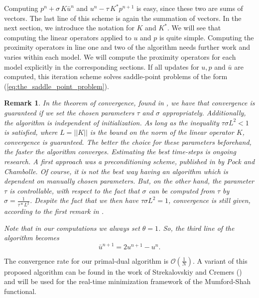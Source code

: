 \documentclass[abstracton]{scrreprt}
\newtheorem{remark}[theorem]{Remark}
\begin{document}
        Computing $p^{n} + \sigma\,K\bar{u}^{n}$ and $u^{n} - \tau\,K^{\ast}p^{n+1}$ is easy, since these two are sums of vectors. The last line of this scheme is again the summation of vectors. In the next section, we introduce the notation for $K$ and $K^{\ast}$. We will see that computing the linear operators applied to $u$ and $p$ is quite simple. Computing the proximity operators in line one and two of the algorithm needs further work and varies within each model. We will compute the proximity operators for each model explicitly in the corresponding sections. If all updates for $u, p$ and $\bar{u}$ are computed, this iteration scheme solves saddle-point problems of the form (\ref{eq:the_saddle_point_problem}).
        \begin{remark}
            In the theorem of convergence, found in \cite{Chambolle10afirst-order}, we have that convergence is guaranteed if we set the chosen parameters $\tau$ and $\sigma$ appropriately. Additionally, the algorithm is independent of initialization. As long as the inequality $\tau\sigma L^{2} < 1$ is satisfied, where $L = ||K||$ is the bound on the norm of the linear operator $K$, convergence is guaranteed. The better the choice for these parameters beforehand, the faster the algorithm converges. Estimating the best time-steps is ongoing research. A first approach was a preconditioning scheme, published in \cite{Pock2011} by Pock and Chambolle. Of course, it is not the best way having an algorithm which is dependent on manually chosen parameters. But, on the other hand, the parameter $\tau$ is controllable, with respect to the fact that $\sigma$ can be computed from $\tau$ by $\sigma = \frac{1}{\tau * L^{2}}$. Despite the fact that we then have $\tau\sigma L^{2} = 1$, convergence is still given, according to the first remark in \cite{Chambolle10afirst-order}.

            Note that in our computations we always set $\theta = 1$. So, the third line of the algorithm becomes
                $$
                    \bar{u}^{n+1} = 2u^{n+1} - u^{n}.
                $$
        \end{remark}
        The convergence rate for our primal-dual algorithm is $\mathcal{O}\left(\frac{1}{N}\right)$. A variant of this proposed algorithm can be found in the work of Strekalovskiy and Cremers (\cite{Strekalovskiy-Cremers-eccv14}) and will be used for the real-time minimization framework of the Mumford-Shah functional.
\end{document}
